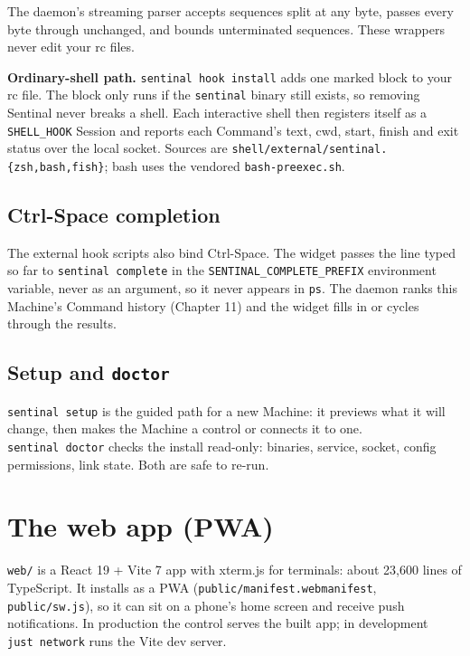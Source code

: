 The daemon's streaming parser accepts sequences split at any byte, passes every byte through unchanged, and bounds unterminated sequences. These wrappers never edit your rc files.

\textbf{Ordinary-shell path.} \texttt{sentinal\ hook\ install} adds one marked block to your rc file. The block only runs if the \texttt{sentinal} binary still exists, so removing Sentinal never breaks a shell. Each interactive shell then registers itself as a \texttt{SHELL\_\allowbreak{}HOOK} Session and reports each Command's text, cwd, start, finish and exit status over the local socket. Sources are \texttt{shell/\allowbreak{}external/\allowbreak{}sentinal.\allowbreak{}\{zsh,\allowbreak{}bash,\allowbreak{}fish\}}; bash uses the vendored \texttt{bash-{}\allowbreak{}preexec.\allowbreak{}sh}.

\section{\texorpdfstring{Ctrl-Space completion}{Ctrl-Space completion}}

The external hook scripts also bind Ctrl-Space. The widget passes the line typed so far to \texttt{sentinal\ complete} in the \texttt{SENTINAL\_\allowbreak{}COMPLETE\_\allowbreak{}PREFIX} environment variable, never as an argument, so it never appears in \texttt{ps}. The daemon ranks this Machine's Command history (Chapter 11) and the widget fills in or cycles through the results.

\section{\texorpdfstring{Setup and \texttt{doctor}}{Setup and doctor}}

\texttt{sentinal\ setup} is the guided path for a new Machine: it previews what it will change, then makes the Machine a control or connects it to one. \texttt{sentinal\ doctor} checks the install read-only: binaries, service, socket, config permissions, link state. Both are safe to re-run.

\chapter{\texorpdfstring{The web app (PWA)}{The web app (PWA)}}

\texttt{web/\allowbreak{}} is a React 19 + Vite 7 app with xterm.js for terminals: about 23,600 lines of TypeScript. It installs as a PWA (\texttt{public/\allowbreak{}manifest.\allowbreak{}webmanifest}, \texttt{public/\allowbreak{}sw.\allowbreak{}js}), so it can sit on a phone's home screen and receive push notifications. In production the control serves the built app; in development \texttt{just\ network} runs the Vite dev server.

